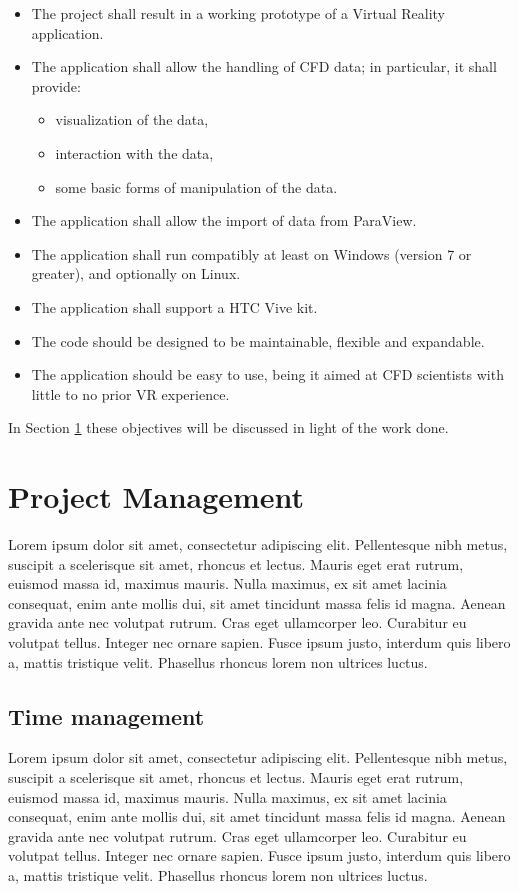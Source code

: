 \begin{itemize}
	\item The project shall result in a working prototype of a Virtual Reality application.
	\item The application shall allow the handling of CFD data; in particular, it shall provide:
	\begin{itemize}
		\item visualization of the data,
		\item interaction with the data,
		\item some basic forms of manipulation of the data.
	\end{itemize}
	\item The application shall allow the import of data from ParaView.
	\item The application shall run compatibly at least on Windows (version 7 or greater), and optionally on Linux.
	\item The application shall support a HTC Vive kit.
	\item The code should be designed to be maintainable, flexible and expandable.
	\item The application should be easy to use, being it aimed at CFD scientists with little to no prior VR experience.
\end{itemize}

In Section \ref{sec:projectmanagement} these objectives will be discussed in light of the work done.

\section{Project Management}\label{sec:projectmanagement}
Lorem ipsum dolor sit amet, consectetur adipiscing elit. Pellentesque nibh metus, suscipit a scelerisque sit amet, rhoncus et lectus. Mauris eget erat rutrum, euismod massa id, maximus mauris. Nulla maximus, ex sit amet lacinia consequat, enim ante mollis dui, sit amet tincidunt massa felis id magna. Aenean gravida ante nec volutpat rutrum. Cras eget ullamcorper leo. Curabitur eu volutpat tellus. Integer nec ornare sapien. Fusce ipsum justo, interdum quis libero a, mattis tristique velit. Phasellus rhoncus lorem non ultrices luctus.

\subsection{Time management}\label{subsec:timemanagement}
Lorem ipsum dolor sit amet, consectetur adipiscing elit. Pellentesque nibh metus, suscipit a scelerisque sit amet, rhoncus et lectus. Mauris eget erat rutrum, euismod massa id, maximus mauris. Nulla maximus, ex sit amet lacinia consequat, enim ante mollis dui, sit amet tincidunt massa felis id magna. Aenean gravida ante nec volutpat rutrum. Cras eget ullamcorper leo. Curabitur eu volutpat tellus. Integer nec ornare sapien. Fusce ipsum justo, interdum quis libero a, mattis tristique velit. Phasellus rhoncus lorem non ultrices luctus.

